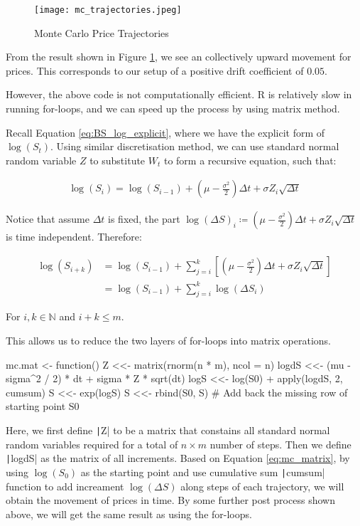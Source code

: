 \begin{figure}[H]
	\centering
	\texttt{[image: mc\_trajectories.jpeg]}
	\caption{Monte Carlo Price Trajectories} \label{img:mc_trajectories}
\end{figure}

From the result shown in Figure \ref{img:mc_trajectories}, we see an collectively upward movement for prices. This corresponds to our setup of a positive drift coefficient of $0.05$.

However, the above code is not computationally efficient. R is relatively slow in running for-loops, and we can speed up the process by using matrix method.

Recall Equation \ref{eq:BS_log_explicit}, where we have the explicit form of $\log(S_t)$. Using similar discretisation method, we can use standard normal random variable $Z$ to substitute $W_t$ to form a recursive equation, such that:

\begin{align*}
\log(S_i) = \log(S_{i-1}) + (\mu - \frac{\sigma^2}{2})\Delta t + \sigma Z_i \sqrt{\Delta t}
\end{align*}

Notice that assume $\Delta t$ is fixed, the part $\log(\Delta S)_i\coloneqq(\mu - \frac{\sigma^2}{2})\Delta t + \sigma Z_i \sqrt{\Delta t}$ is time independent. Therefore:

\begin{align}
\log(S_{i+k}) &= \log(S_{i-1}) + \sum_{j=i}^{k}{\left[(\mu - \frac{\sigma^2}{2})\Delta t + \sigma Z_i \sqrt{\Delta t}\right]} \\
&= \log(S_{i-1}) + \sum_{j=i}^{k}{\log(\Delta S_i)} \label{eq:mc_matrix}
\end{align}

For $i,k\in\mathbb{N}$ and $i+k\leq m$.

This allows us to reduce the two layers of for-loops into matrix operations.

\begin{Rminted}
mc.mat <- function() {
    Z <<- matrix(rnorm(n * m), ncol = n)
    logdS <<- (mu - sigma^2 / 2) * dt + sigma * Z * sqrt(dt)
    logS <<- log(S0) + apply(logdS, 2, cumsum)
    S <<- exp(logS)
    S <<- rbind(S0, S) # Add back the missing row of starting point S0
}
\end{Rminted}

Here, we first define \texttt|Z| to be a matrix that constains all standard normal random variables required for a total of $n\times m$ number of steps. Then we define \texttt|logdS| as the matrix of all increments. Based on Equation \ref{eq:mc_matrix}, by using $\log(S_0)$ as the starting point and use cumulative sum \texttt|cumsum| function to add increament $\log(\Delta S)$ along steps of each trajectory, we will obtain the movement of prices in time. By some further post process shown above, we will get the same result as using the for-loops.

